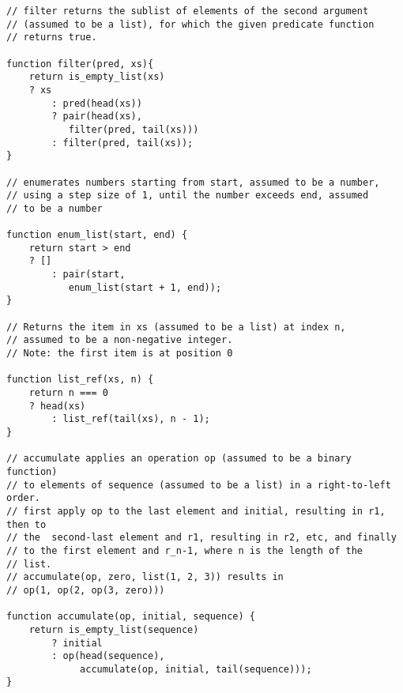 \begin{lstlisting}
// filter returns the sublist of elements of the second argument
// (assumed to be a list), for which the given predicate function
// returns true.

function filter(pred, xs){
    return is_empty_list(xs)
	? xs
        : pred(head(xs))
	    ? pair(head(xs),
		   filter(pred, tail(xs)))
	    : filter(pred, tail(xs));
}

// enumerates numbers starting from start, assumed to be a number,
// using a step size of 1, until the number exceeds end, assumed
// to be a number

function enum_list(start, end) {
    return start > end
	? []
        : pair(start,
	       enum_list(start + 1, end));
}

// Returns the item in xs (assumed to be a list) at index n,
// assumed to be a non-negative integer.
// Note: the first item is at position 0

function list_ref(xs, n) {
    return n === 0
	? head(xs)
        : list_ref(tail(xs), n - 1);
}

// accumulate applies an operation op (assumed to be a binary function)
// to elements of sequence (assumed to be a list) in a right-to-left order.
// first apply op to the last element and initial, resulting in r1, then to
// the  second-last element and r1, resulting in r2, etc, and finally
// to the first element and r_n-1, where n is the length of the
// list.
// accumulate(op, zero, list(1, 2, 3)) results in
// op(1, op(2, op(3, zero)))

function accumulate(op, initial, sequence) {
    return is_empty_list(sequence)
        ? initial
        : op(head(sequence),
             accumulate(op, initial, tail(sequence)));
}
\end{lstlisting}


